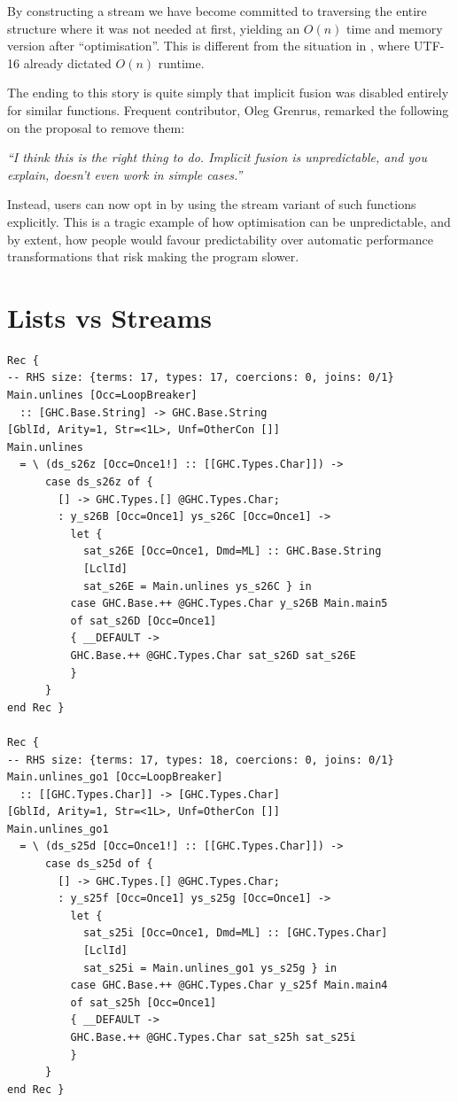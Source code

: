 By constructing a stream we have become committed to traversing the entire structure where it was not needed at first,
yielding an $O(n)$ time and memory version after ``optimisation''. This is different from the situation in ,
where UTF-16 already dictated $O(n)$ runtime.

The ending to this story is quite simply that implicit fusion was disabled entirely \cite{two_tails} for similar functions.
Frequent  contributor, Oleg Grenrus, remarked the following on the proposal to remove them:

\textit{``I think this is the right thing to do. Implicit fusion is unpredictable, and you explain, doesn't even work in simple cases.''}

Instead, users can now opt in by using the stream variant of such functions explicitly. This is a tragic example of how optimisation
can be unpredictable, and by extent, how people would favour predictability over automatic performance transformations that risk making the program slower.

\section{Lists vs Streams}

\begin{verbatim}
Rec {
-- RHS size: {terms: 17, types: 17, coercions: 0, joins: 0/1}
Main.unlines [Occ=LoopBreaker]
  :: [GHC.Base.String] -> GHC.Base.String
[GblId, Arity=1, Str=<1L>, Unf=OtherCon []]
Main.unlines
  = \ (ds_s26z [Occ=Once1!] :: [[GHC.Types.Char]]) ->
      case ds_s26z of {
        [] -> GHC.Types.[] @GHC.Types.Char;
        : y_s26B [Occ=Once1] ys_s26C [Occ=Once1] ->
          let {
            sat_s26E [Occ=Once1, Dmd=ML] :: GHC.Base.String
            [LclId]
            sat_s26E = Main.unlines ys_s26C } in
          case GHC.Base.++ @GHC.Types.Char y_s26B Main.main5
          of sat_s26D [Occ=Once1]
          { __DEFAULT ->
          GHC.Base.++ @GHC.Types.Char sat_s26D sat_s26E
          }
      }
end Rec }

Rec {
-- RHS size: {terms: 17, types: 18, coercions: 0, joins: 0/1}
Main.unlines_go1 [Occ=LoopBreaker]
  :: [[GHC.Types.Char]] -> [GHC.Types.Char]
[GblId, Arity=1, Str=<1L>, Unf=OtherCon []]
Main.unlines_go1
  = \ (ds_s25d [Occ=Once1!] :: [[GHC.Types.Char]]) ->
      case ds_s25d of {
        [] -> GHC.Types.[] @GHC.Types.Char;
        : y_s25f [Occ=Once1] ys_s25g [Occ=Once1] ->
          let {
            sat_s25i [Occ=Once1, Dmd=ML] :: [GHC.Types.Char]
            [LclId]
            sat_s25i = Main.unlines_go1 ys_s25g } in
          case GHC.Base.++ @GHC.Types.Char y_s25f Main.main4
          of sat_s25h [Occ=Once1]
          { __DEFAULT ->
          GHC.Base.++ @GHC.Types.Char sat_s25h sat_s25i
          }
      }
end Rec }

\end{verbatim}




